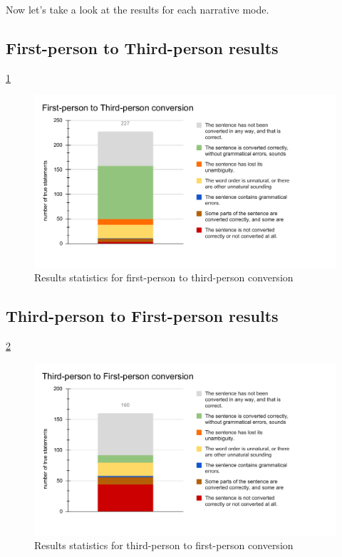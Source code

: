 Now let's take a look at the results for each narrative mode.

\subsection{First-person to Third-person results}

\ref{fig:eval-first-to-third}

\begin{figure}[!ht]
\includegraphics[width=\textwidth]{data/Eval-First-To-Third.pdf}
\caption{Results statistics for first-person to third-person conversion}
\label{fig:eval-first-to-third}
\end{figure}

\subsection{Third-person to First-person results}
\ref{fig:eval-third-to-first}

\begin{figure}[!ht]
\includegraphics[width=\textwidth]{data/Eval-Third-To-First.pdf}
\caption{Results statistics for third-person to first-person conversion}
\label{fig:eval-third-to-first}
\end{figure}

